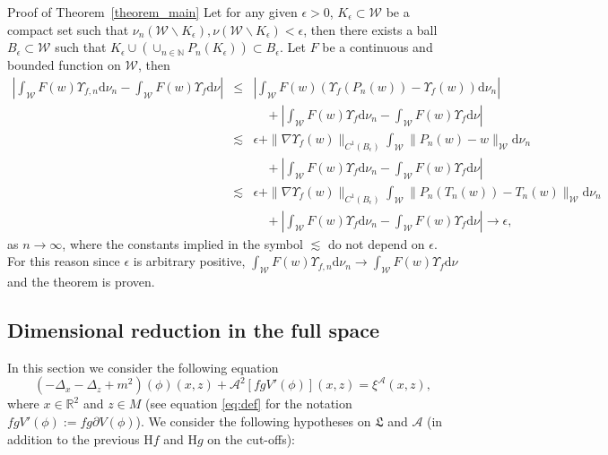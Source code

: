 \documentclass[a4paper,10pt]{article}
\newcommand{\mathd}{\mathrm{d}}
\newenvironment{proof*}[1]{\noindent\textbf{#1\ }}{\hspace*{\fill}$\Box$\medskip}
\begin{document}
\begin{proof*}{Proof of Theorem~\ref{theorem_main}}
  Let for any given $\epsilon > 0$, $K_{\epsilon} \subset \mathcal{W}$ be a
  compact set such that $\nu_n (\mathcal{W} \backslash K_{\epsilon}), \nu
  (\mathcal{W} \backslash K_{\epsilon}) < \epsilon$, then there exists a ball
  $B_{\epsilon} \subset \mathcal{W}$ such that $K_{\epsilon} \cup (\cup_{n \in
  \mathbb{N}} P_n (K_{\epsilon})) \subset B_{\epsilon}$. Let $F$ be a
  continuous and bounded function on $\mathcal{W}$, then
  \begin{eqnarray}
    \left| \int_{\mathcal{W}} F (w) \Upsilon_{f, n} \mathd \nu_n -
    \int_{\mathcal{W}} F (w) \Upsilon_f \mathd \nu \right| & \leqslant &
    \left| \int_{\mathcal{W}} F (w) (\Upsilon_f (P_n (w)) - \Upsilon_f (w))
    \mathd \nu_n \right| \nonumber\\
    &  & \quad + \left| \int_{\mathcal{W}} F (w) \Upsilon_f \mathd \nu_n -
    \int_{\mathcal{W}} F (w) \Upsilon_f \mathd \nu \right| \nonumber\\
    & \lesssim & \epsilon + \| \nabla \Upsilon_f (w) \|_{C^1 (B_{\epsilon})}
    \int_{\mathcal{W}} \| P_n (w) - w \|_{\mathcal{W}} \mathd \nu_n
    \nonumber\\
    &  & \quad + \left| \int_{\mathcal{W}} F (w) \Upsilon_f \mathd \nu_n -
    \int_{\mathcal{W}} F (w) \Upsilon_f \mathd \nu \right| \nonumber\\
    & \lesssim & \epsilon + \| \nabla \Upsilon_f (w) \|_{C^1 (B_{\epsilon})}
    \int_{\mathcal{W}} \| P_n (T_n (w)) - T_n (w) \|_{\mathcal{W}} \mathd
    \nu_n \nonumber\\
    &  & \quad + \left| \int_{\mathcal{W}} F (w) \Upsilon_f \mathd \nu_n -
    \int_{\mathcal{W}} F (w) \Upsilon_f \mathd \nu \right| \rightarrow
    \epsilon, \nonumber
  \end{eqnarray}
  as $n \rightarrow \infty$, where the constants implied in the symbol
  $\lesssim$ do not depend on $\epsilon$. For this reason since $\epsilon$ is
  arbitrary positive, $\int_{\mathcal{W}} F (w) \Upsilon_{f, n} \mathd \nu_n
  \rightarrow \int_{\mathcal{W}} F (w) \Upsilon_f \mathd \nu$ and the theorem
  is proven.
\end{proof*}

\subsection{Dimensional reduction in the full
space}\label{subsection_extension1}

In this section we consider the following equation
\begin{equation}
  (- \Delta_x - \Delta_z + m^2) (\phi) (x, z) + \mathcal{A}^2 [f g
  V'(\phi) ] (x, z) = \xi^{\mathcal{A}} (x, z) \label{eq:extension1},
\end{equation}
where $x \in \mathbb{R}^2$ and $z \in M$ (see equation \eqref{eq:def} for the notation $fgV'(\phi):=fg\partial V(\phi)$). We consider the following
hypotheses on $\mathfrak{L}$ and $\mathcal{A}$ (in addition to the previous
H$f$ and H$g$ on the cut-offs):
\end{document}
